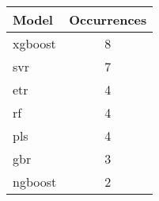 \begin{tabular}{lc}
Model & Occurrences \\
\hline
\gls{xgboost} & 8 \\
\gls{svr} & 7 \\
\gls{etr} & 4 \\
\gls{rf} & 4 \\
\gls{pls} & 4 \\
\gls{gbr} & 3 \\
\gls{ngboost} & 2 \\
\end{tabular}
\label{tab:best_model_occurrences}
